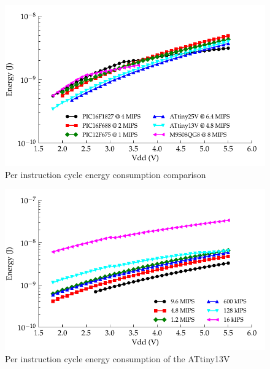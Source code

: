      \begin{figure}
      \begin{centering}
      \includegraphics{content/pt1/03-EnergyRequirements/graphics/Graph_All_Clock_JPI}
      \par\end{centering}

      \protect\caption{\label{fig:Per-instruction-cycle}Per instruction cycle energy consumption
      comparison}
      \end{figure}
      \begin{figure}
      \begin{centering}
      \includegraphics{content/pt1/03-EnergyRequirements/graphics/Graph_ATtiny13V_Clock_JPI}
      \par\end{centering}

      \protect\caption{\label{fig:Per-instruction-ATtiny13V}Per instruction cycle energy
      consumption of the ATtiny13V}
      \end{figure}



